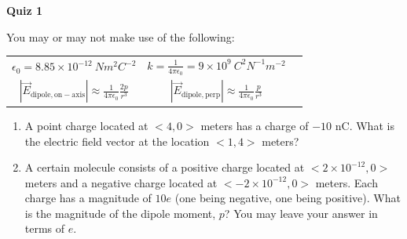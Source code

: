 \documentclass{article}
\begin{document}
\fancyfoot[C]{\thepage}
\vspace*{0cm}
\begin{center}
	{\LARGE \textbf{Quiz 1}}
\end{center}
You may or may not make use of the following:
\vspace{.5cm}

\renewcommand{\arraystretch}{2}
\begin{tabular}{ccc}
$\epsilon_0=8.85\times10^{-12}\ Nm^2C^{-2}$ & $k=\frac{1}{4\pi\epsilon_0}=9\times10^9\ C^2N^{-1}m^{-2}$\\
$|\vec{E}_\mathrm{dipole,on-axis}| \approx \frac{1}{4\pi\epsilon_0}\frac{2p}{r^3}$ & $|\vec{E}_\mathrm{dipole,perp}| \approx \frac{1}{4\pi\epsilon_0}\frac{p}{r^3}$
\end{tabular}
\begin{enumerate}
\item A point charge located at $<4,0>$ meters has a charge of $-10$ nC. What is the electric field vector at the location $<1,4>$ meters?
\vspace{10cm}
\item A certain molecule consists of a positive charge located at $<2\times10^{-12},0>$ meters and a negative charge located at $<-2\times10^{-12},0>$ meters. Each charge has a magnitude of $10e$ (one being negative, one being positive). What is the magnitude of the dipole moment, $p$? You may leave your answer in terms of $e$.
\end{enumerate}
\end{document}
